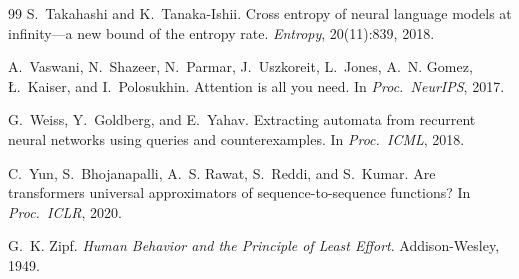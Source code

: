 \begin{thebibliography}{99}
S.~Takahashi and K.~Tanaka-Ishii.
\newblock Cross entropy of neural language models at infinity---a new bound of the entropy rate.
\newblock \emph{Entropy}, 20(11):839, 2018.

A.~Vaswani, N.~Shazeer, N.~Parmar, J.~Uszkoreit, L.~Jones, A.~N. Gomez, {\L}.~Kaiser, and I.~Polosukhin.
\newblock Attention is all you need.
\newblock In \emph{Proc.\ NeurIPS}, 2017.

G.~Weiss, Y.~Goldberg, and E.~Yahav.
\newblock Extracting automata from recurrent neural networks using queries and counterexamples.
\newblock In \emph{Proc.\ ICML}, 2018.

C.~Yun, S.~Bhojanapalli, A.~S. Rawat, S.~Reddi, and S.~Kumar.
\newblock Are transformers universal approximators of sequence-to-sequence functions?
\newblock In \emph{Proc.\ ICLR}, 2020.

G.~K. Zipf.
\newblock \emph{Human Behavior and the Principle of Least Effort}.
\newblock Addison-Wesley, 1949.

\end{thebibliography}
